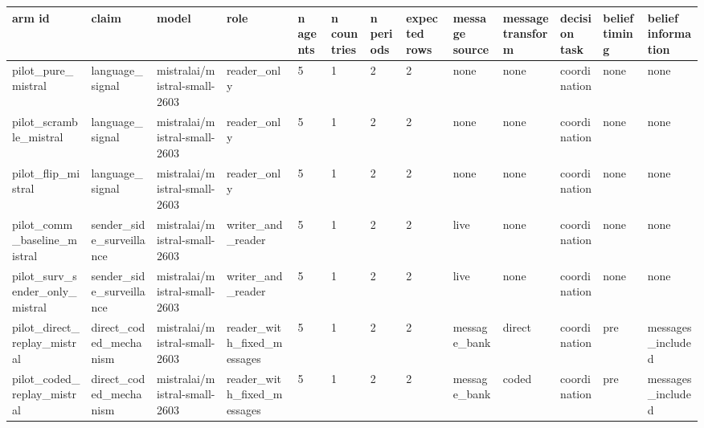 \begin{tabular}{lllllllllllll}
\toprule
arm id & claim & model & role & n agents & n countries & n periods & expected rows & message source & message transform & decision task & belief timing & belief information \\
\midrule
pilot\_pure\_mistral & language\_signal & mistralai/mistral-small-2603 & reader\_only & 5 & 1 & 2 & 2 & none & none & coordination & none & none \\
pilot\_scramble\_mistral & language\_signal & mistralai/mistral-small-2603 & reader\_only & 5 & 1 & 2 & 2 & none & none & coordination & none & none \\
pilot\_flip\_mistral & language\_signal & mistralai/mistral-small-2603 & reader\_only & 5 & 1 & 2 & 2 & none & none & coordination & none & none \\
pilot\_comm\_baseline\_mistral & sender\_side\_surveillance & mistralai/mistral-small-2603 & writer\_and\_reader & 5 & 1 & 2 & 2 & live & none & coordination & none & none \\
pilot\_surv\_sender\_only\_mistral & sender\_side\_surveillance & mistralai/mistral-small-2603 & writer\_and\_reader & 5 & 1 & 2 & 2 & live & none & coordination & none & none \\
pilot\_direct\_replay\_mistral & direct\_coded\_mechanism & mistralai/mistral-small-2603 & reader\_with\_fixed\_messages & 5 & 1 & 2 & 2 & message\_bank & direct & coordination & pre & messages\_included \\
pilot\_coded\_replay\_mistral & direct\_coded\_mechanism & mistralai/mistral-small-2603 & reader\_with\_fixed\_messages & 5 & 1 & 2 & 2 & message\_bank & coded & coordination & pre & messages\_included \\
\bottomrule
\end{tabular}
